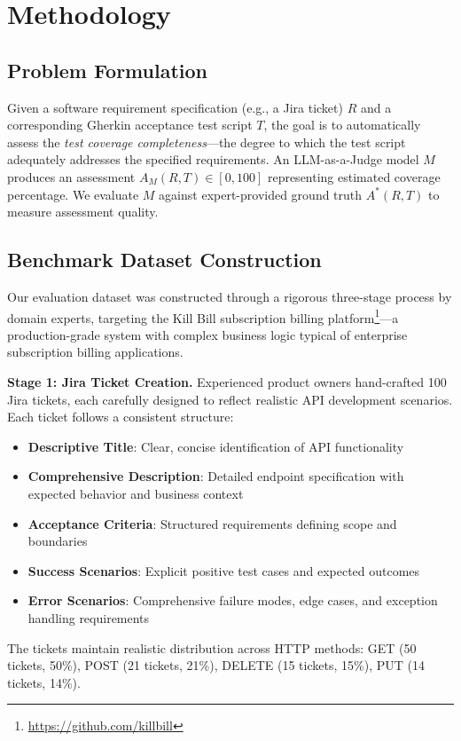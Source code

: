 \documentclass[letterpaper]{article} %
\begin{document}
\section{Methodology}
\label{sec:methodology}

\subsection{Problem Formulation}
Given a software requirement specification (e.g., a Jira ticket) $R$ and a corresponding Gherkin acceptance test script $T$, the goal is to automatically assess the \textit{test coverage completeness}---the degree to which the test script adequately addresses the specified requirements. An LLM-as-a-Judge model $M$ produces an assessment $A_M(R, T) \in [0, 100]$ representing estimated coverage percentage. We evaluate $M$ against expert-provided ground truth $A^*(R, T)$ to measure assessment quality.

\subsection{Benchmark Dataset Construction}
Our evaluation dataset was constructed through a rigorous three-stage process by domain experts, targeting the Kill Bill subscription billing platform\footnote{\url{https://github.com/killbill}}---a production-grade system with complex business logic typical of enterprise subscription billing applications.

\textbf{Stage 1: Jira Ticket Creation.} Experienced product owners hand-crafted 100 Jira tickets, each carefully designed to reflect realistic API development scenarios. Each ticket follows a consistent structure:
\begin{itemize}[nosep]
\item \textbf{Descriptive Title}: Clear, concise identification of API functionality
\item \textbf{Comprehensive Description}: Detailed endpoint specification with expected behavior and business context
\item \textbf{Acceptance Criteria}: Structured requirements defining scope and boundaries
\item \textbf{Success Scenarios}: Explicit positive test cases and expected outcomes
\item \textbf{Error Scenarios}: Comprehensive failure modes, edge cases, and exception handling requirements
\end{itemize}

The tickets maintain realistic distribution across HTTP methods: GET (50 tickets, 50\%), POST (21 tickets, 21\%), DELETE (15 tickets, 15\%), PUT (14 tickets, 14\%).
\end{document}
